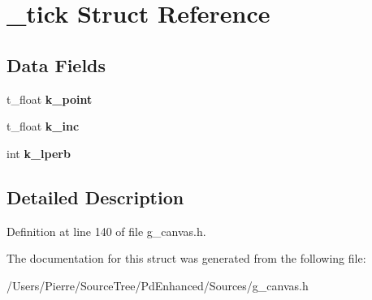 \hypertarget{struct__tick}{\section{\-\_\-tick Struct Reference}
\label{struct__tick}
}
\subsection*{Data Fields}
\begin{DoxyCompactItemize}
\item 
\hypertarget{struct__tick_ab1940b34338b1a0bb7ffc57453206ef1}{t\-\_\-float {\bfseries k\-\_\-point}}\label{struct__tick_ab1940b34338b1a0bb7ffc57453206ef1}

\item 
\hypertarget{struct__tick_ae08996c98680d053cb75a0d66d5bf2b9}{t\-\_\-float {\bfseries k\-\_\-inc}}\label{struct__tick_ae08996c98680d053cb75a0d66d5bf2b9}

\item 
\hypertarget{struct__tick_a9c5fc8f9d4982e3d2c271bea74b0a308}{int {\bfseries k\-\_\-lperb}}\label{struct__tick_a9c5fc8f9d4982e3d2c271bea74b0a308}

\end{DoxyCompactItemize}


\subsection{Detailed Description}


Definition at line 140 of file g\-\_\-canvas.\-h.



The documentation for this struct was generated from the following file\-:\begin{DoxyCompactItemize}
\item 
/\-Users/\-Pierre/\-Source\-Tree/\-Pd\-Enhanced/\-Sources/g\-\_\-canvas.\-h\end{DoxyCompactItemize}
